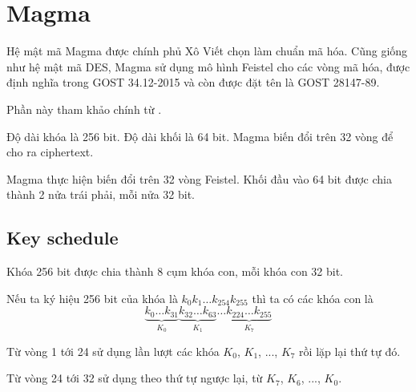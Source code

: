 \chapter{Magma}

Hệ mật mã Magma được chính phủ Xô Viết chọn làm chuẩn mã hóa.
Cũng giống như hệ mật mã DES, Magma sử dụng mô hình Feistel
cho các vòng mã hóa, được định nghĩa trong GOST 34.12-2015
và còn được đặt tên là GOST 28147-89. 

Phần này tham khảo chính từ \cite{Gashkov}.

Độ dài khóa là 256 bit. Độ dài khối là 64 bit. Magma biến
đổi trên 32 vòng để cho ra ciphertext.

Magma thực hiện biến đổi trên 32 vòng Feistel. Khối đầu vào 
64 bit được chia thành 2 nửa trái phải, mỗi nửa 32 bit.

\section{Key schedule}

Khóa 256 bit được chia thành 8 cụm khóa con, mỗi khóa con 32 bit.

Nếu ta ký hiệu 256 bit của khóa là $k_{0} k_{1} \ldots k_{254} k_{255}$
thì ta có các khóa con là
\[ \underbrace{k_0 \ldots k_{31}}_{K_0} \underbrace{k_{32} \ldots k_{63}}_{K_1}
    \ldots \underbrace{k_{224} \ldots k_{255}}_{K_7}\]

Từ vòng 1 tới 24 sử dụng lần lượt các khóa $K_0$, $K_1$, ..., $K_7$
rồi lặp lại thứ tự đó.

Từ vòng 24 tới 32 sử dụng theo thứ tự ngược lại, từ $K_7$, $K_6$, ...,
$K_0$.

